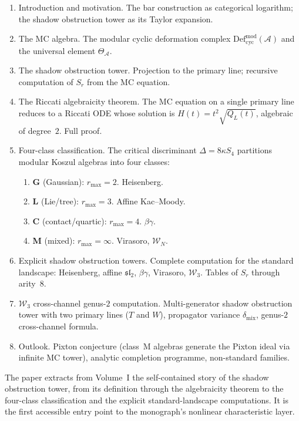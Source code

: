 \documentclass[11pt]{article}
\newcommand{\cA}{\mathcal{A}}
\newcommand{\cW}{\mathcal{W}}
\newcommand{\fsl}{\mathfrak{sl}}
\begin{document}
\begin{enumerate}[label=\S\arabic*.,nosep]
\item Introduction and motivation.  The bar construction as
  categorical logarithm; the shadow obstruction tower as its Taylor
  expansion.
\item The MC algebra.  The modular cyclic deformation complex
  $\mathrm{Def}^{\mathrm{mod}}_{\mathrm{cyc}}(\cA)$ and the
  universal element $\Theta_\cA$.
\item The shadow obstruction tower.  Projection to the primary line;
  recursive computation of $S_r$ from the MC equation.
\item The Riccati algebraicity theorem.  The MC equation on a
  single primary line reduces to a Riccati ODE whose solution
  is $H(t) = t^2\sqrt{Q_L(t)}$, algebraic of degree~$2$.
  Full proof.
\item Four-class classification.  The critical discriminant
  $\Delta = 8\kappa S_4$ partitions modular Koszul algebras
  into four classes:
  \begin{enumerate}[label=(\alph*),nosep]
  \item \textbf{G} (Gaussian): $r_{\max} = 2$.  Heisenberg.
  \item \textbf{L} (Lie/tree): $r_{\max} = 3$.  Affine
    Kac--Moody.
  \item \textbf{C} (contact/quartic): $r_{\max} = 4$.
    $\beta\gamma$.
  \item \textbf{M} (mixed): $r_{\max} = \infty$.  Virasoro,
    $\cW_N$.
  \end{enumerate}
\item Explicit shadow obstruction towers.  Complete computation for the
  standard landscape: Heisenberg, affine $\fsl_2$,
  $\beta\gamma$, Virasoro, $\cW_3$.  Tables of $S_r$ through
  arity~$8$.
\item $\cW_3$ cross-channel genus-$2$ computation.
  Multi-generator shadow obstruction tower with two primary lines
  ($T$ and $W$), propagator variance $\delta_{\mathrm{mix}}$,
  genus-$2$ cross-channel formula.
\item Outlook.  Pixton conjecture (class~M algebras generate
  the Pixton ideal via infinite MC tower), analytic completion
  programme, non-standard families.
\end{enumerate}

The paper extracts from Volume~I the self-contained story of
the shadow obstruction tower, from its definition through the algebraicity
theorem to the four-class classification and the explicit
standard-landscape computations.  It is the first accessible
entry point to the monograph's nonlinear characteristic layer.
\end{document}
